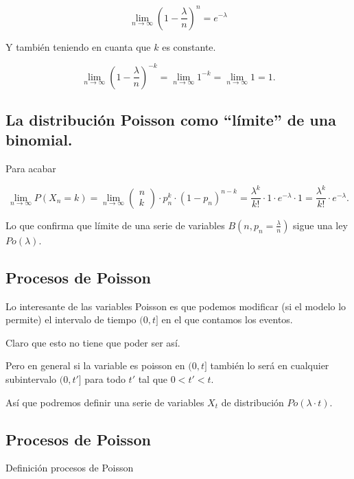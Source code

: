 \documentclass[]{book}
\begin{document}
\[
\lim_{n\to \infty} \left(1-\frac{\lambda}{n}\right)^{n}=e^{-\lambda}
\]

Y también teniendo en cuanta que \(k\) es constante.

\[
\lim_{n\to \infty} \left(1-\frac{\lambda}{n}\right)^{-k}=\lim_{n\to \infty} 1^{-k}=\lim_{n\to \infty}  1=1.
\]

\hypertarget{la-distribuciuxf3n-poisson-como-luxedmite-de-una-binomial.-6}{%
\subsection{La distribución Poisson como ``límite'' de una binomial.}\label{la-distribuciuxf3n-poisson-como-luxedmite-de-una-binomial.-6}}

Para acabar

\[
\displaystyle\lim_{n\to\infty} P(X_n=k)=
\lim_{n\to\infty} \left(\begin{array}{c} n\\ k\end{array}\right)
\cdot p_n^k \cdot (1-p_n)^{n-k}= \frac{\lambda^k}{k!}\cdot 1 \cdot e^{-\lambda}\cdot 1=\frac{\lambda^k}{k!}\cdot e^{-\lambda}.
\]

Lo que confirma que límite de una serie de variables
\(B(n,p_n=\frac{\lambda}{n})\) sigue una ley \(Po(\lambda)\).

\hypertarget{procesos-de-poisson}{%
\subsection{Procesos de Poisson}\label{procesos-de-poisson}}

Lo interesante de las variables Poisson es que podemos modificar (si el modelo lo permite) el intervalo de tiempo \((0,t]\) en el que contamos los eventos.

Claro que esto no tiene que poder ser así.

Pero en general si la variable es poisson en \((0,t]\) también lo será en cualquier subintervalo \((0,t']\) para todo \(t'\) tal que \(0<t'<t\).

Así que podremos definir una serie de variables \(X_t\) de distribución \(Po(\lambda\cdot t)\).

\hypertarget{procesos-de-poisson-1}{%
\subsection{Procesos de Poisson}\label{procesos-de-poisson-1}}

 Definición procesos de Poisson
\end{document}
